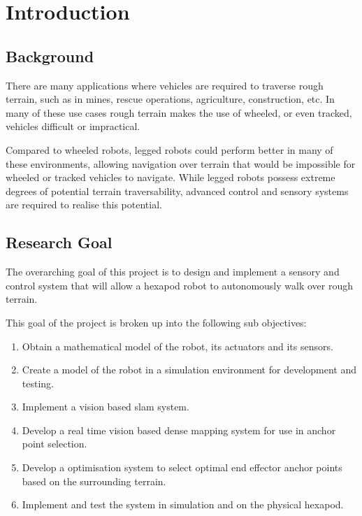 \chapter{Introduction}

\section{Background}

There are many applications where vehicles are required to traverse rough terrain, such as in mines, rescue operations, agriculture, construction, etc. In many of these
use cases rough terrain makes the use of wheeled, or even tracked, vehicles difficult or impractical.

Compared to wheeled robots, legged robots could perform better in many of these environments, allowing navigation over terrain that would be impossible for wheeled or
tracked vehicles to navigate. While legged robots possess extreme degrees of potential terrain traversability, advanced control and sensory systems are required to 
realise this potential.


\section{Research Goal}
The overarching goal of this project is to design and implement a sensory and control system that will allow a hexapod robot to autonomously walk over rough terrain.

This goal of the project is broken up into the following sub objectives:

\begin{enumerate}
    \item Obtain a mathematical model of the robot, its actuators and its sensors.
    \item Create a model of the robot in a simulation environment for development and testing.
    \item Implement a vision based \ac{slam} system.
    \item Develop a real time vision based dense mapping system for use in anchor point selection.
    \item Develop a optimisation system to select optimal end effector anchor points based on the surrounding terrain.
    \item Implement and test the system in simulation and on the physical hexapod.
\end{enumerate}


